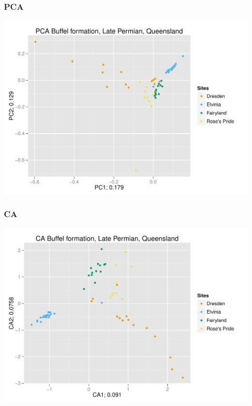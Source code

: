 \documentclass{beamer}\usepackage{graphicx, color}
\makeatletter
\def\maxwidth{ %
  \ifdim\Gin@nat@width>\linewidth
    \linewidth
  \else
    \Gin@nat@width
  \fi
}
\newenvironment{knitrout}{}{} %
\makeatother
\begin{document}
\begin{frame}
\frametitle{PCA}

\begin{knitrout}
\color{fgcolor}\includegraphics[width=\maxwidth]{figure/buffel-pca} 
\end{knitrout}



\end{frame}


\begin{frame}
\frametitle{CA}

\begin{knitrout}
\color{fgcolor}\includegraphics[width=\maxwidth]{figure/buffel-ca} 
\end{knitrout}


\end{frame}
\end{document}
